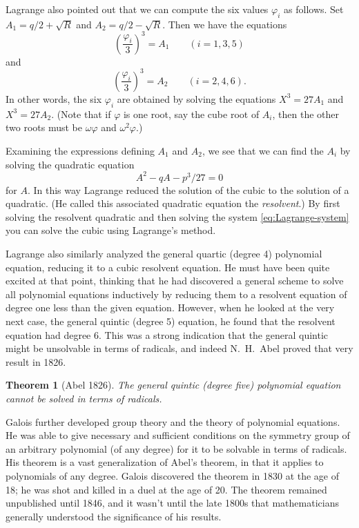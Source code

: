 \documentclass[11pt]{article}
\newtheorem*{thm*}{Theorem}
\theoremstyle{definition}
\begin{document}
Lagrange also pointed out that we can compute the six values
$\varphi_i$ as follows. Set $A_1 = q/2 + \sqrt{R}$ and $A_2 = q/2 -
\sqrt{R}$. Then we have the equations
$$
\left(\frac{\varphi_i}{3}\right)^3 = A_1 \qquad (i = 1,3,5)
$$
and 
$$
\left(\frac{\varphi_i}{3}\right)^3 = A_2 \qquad (i = 2,4,6).
$$ 
In other words, the six $\varphi_i$ are obtained by solving the
equations $X^3 = 27A_1$ and $X^3 = 27A_2$. (Note that if $\varphi$ is one
root, say the cube root of $A_i$, then the other two roots must be $\omega
\varphi$ and $\omega^2 \varphi$.)

Examining the expressions defining $A_1$ and $A_2$, we see that we can
find the $A_i$ by solving the quadratic equation
\begin{equation}\label{eq:Lagrange-resolvant}
   A^2 - q A - p^3/27 = 0
\end{equation}
for $A$. In this way Lagrange reduced the solution of the cubic to the
solution of a quadratic. (He called this associated quadratic equation
the {\em resolvent}.) By first solving the resolvent quadratic and
then solving the system \eqref{eq:Lagrange-system} you can solve the
cubic using Lagrange's method.


Lagrange also similarly analyzed the general
quartic (degree 4) polynomial equation,
reducing it to a cubic resolvent equation. He must have been quite
excited at that point, thinking that he had discovered a general
scheme to solve all polynomial equations inductively by reducing them
to a resolvent equation of degree one less than the given equation.
However, when he looked at the very next case, the general quintic
(degree 5) equation, he found that the resolvent equation had degree
6. This was a strong indication that the general quintic might be
unsolvable in terms of radicals, and indeed N.\ H.\ Abel proved that
very result in 1826.

\begin{thm*}[Abel 1826]
  The general quintic (degree five) polynomial equation cannot be
  solved in terms of radicals.
\end{thm*}

Galois further developed group theory and the theory of polynomial
equations. He was able to give necessary and sufficient conditions on
the symmetry group of an arbitrary polynomial (of any degree) for it
to be solvable in terms of radicals. His theorem is a vast
generalization of Abel's theorem, in that it applies to polynomials of
any degree. Galois discovered the theorem in 1830 at the age of 18; he
was shot and killed in a duel at the age of 20. The theorem remained
unpublished until 1846, and it wasn't until the late 1800s that
mathematicians generally understood the significance of his results.
\end{document}
